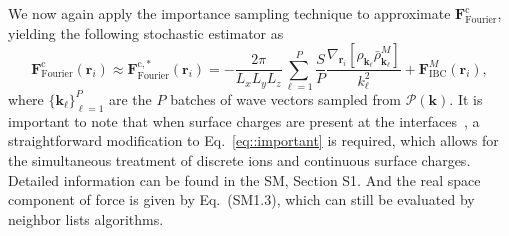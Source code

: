We now again apply the importance sampling technique to approximate $\bm{F}_{\text{Fourier}}^{\text{c}}$, yielding the following stochastic estimator as 
\begin{equation}\label{eq::important}
\bm{F}_{\text{Fourier}}^{\text{c}}(\bm{r}_i)\approx \bm{F}_{\text{Fourier}}^{\text{c},*}(\bm{r}_i)=-\frac{2\pi }{L_xL_yL_z}\sum_{\ell=1}^{P}\frac{S}{P}\frac{\nabla_{\bm{r}_i}\left[\rho_{\bm{k}_{\ell}}\bar{\rho}_{\bm{k}_{\ell}}^{M}\right]}{k_{\ell}^2}+\bm{F}_{\text{IBC}}^{M}(\bm{r}_i),
\end{equation}
where $\{\bm{k}_{\ell}\}_{\ell=1}^{P}$ are the $P$ batches of wave vectors sampled from $\mathscr{P}(\bm{k})$. 
It is important to note that when surface charges are present at the interfaces~\cite{spohr1997effect,yi2017note,yuan2021particle}, a straightforward modification to Eq.~\eqref{eq::important} is required, which allows for the simultaneous treatment of discrete ions and continuous surface charges.
Detailed information can be found in the SM, Section S1.
And the real space component of force is given by Eq.~(SM1.3), which can still be evaluated by neighbor lists algorithms.


